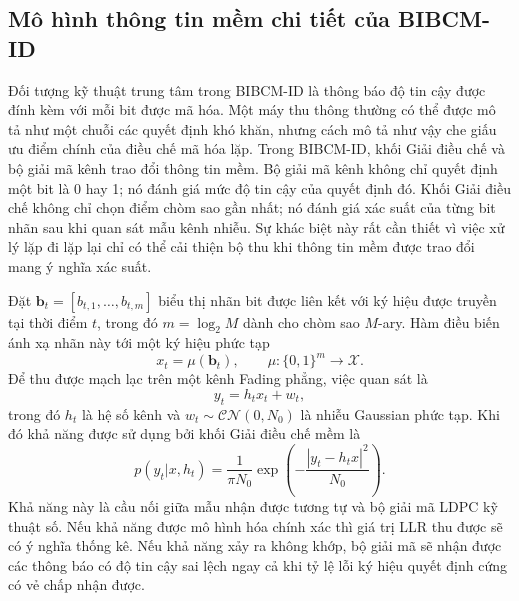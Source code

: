 \subsection{Mô hình thông tin mềm chi tiết của BIBCM-ID}
Đối tượng kỹ thuật trung tâm trong BIBCM-ID là thông báo độ tin cậy được đính kèm với mỗi bit được mã hóa. Một máy thu thông thường có thể được mô tả như một chuỗi các quyết định khó khăn, nhưng cách mô tả như vậy che giấu ưu điểm chính của điều chế mã hóa lặp. Trong BIBCM-ID, khối Giải điều chế và bộ giải mã kênh trao đổi thông tin mềm. Bộ giải mã kênh không chỉ quyết định một bit là 0 hay 1; nó đánh giá mức độ tin cậy của quyết định đó. Khối Giải điều chế không chỉ chọn điểm chòm sao gần nhất; nó đánh giá xác suất của từng bit nhãn sau khi quan sát mẫu kênh nhiễu. Sự khác biệt này rất cần thiết vì việc xử lý lặp đi lặp lại chỉ có thể cải thiện bộ thu khi thông tin mềm được trao đổi mang ý nghĩa xác suất.

Đặt $\mathbf{b}_t=[b_{t,1},\ldots,b_{t,m}]$ biểu thị nhãn bit được liên kết với ký hiệu được truyền tại thời điểm $t$, trong đó $m=\log_2 M$ dành cho chòm sao $M$-ary. Hàm điều biến ánh xạ nhãn này tới một ký hiệu phức tạp
\begin{equation}
  x_t=\mu(\mathbf{b}_t), \qquad \mu:\{0,1\}^{m}\rightarrow\mathcal{X}.
\end{equation}
Để thu được mạch lạc trên một kênh Fading phẳng, việc quan sát là
\begin{equation}
  y_t=h_t x_t+w_t,
\end{equation}
trong đó $h_t$ là hệ số kênh và $w_t\sim\mathcal{CN}(0,N_0)$ là nhiễu Gaussian phức tạp. Khi đó khả năng được sử dụng bởi khối Giải điều chế mềm là
\begin{equation}
  p(y_t|x,h_t)=\frac{1}{\pi N_0}\exp\left(-\frac{|y_t-h_t x|^2}{N_0}\right).
\end{equation}
Khả năng này là cầu nối giữa mẫu nhận được tương tự và bộ giải mã LDPC kỹ thuật số. Nếu khả năng được mô hình hóa chính xác thì giá trị LLR thu được sẽ có ý nghĩa thống kê. Nếu khả năng xảy ra không khớp, bộ giải mã sẽ nhận được các thông báo có độ tin cậy sai lệch ngay cả khi tỷ lệ lỗi ký hiệu quyết định cứng có vẻ chấp nhận được.

